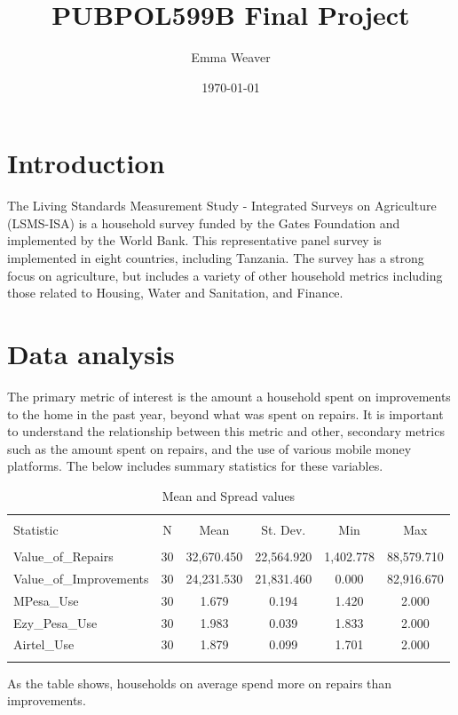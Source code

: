 \documentclass[11pt]{article}
\title{PUBPOL599B Final Project}
\author{
        Emma Weaver\\
}
\date{\today}
\begin{document}


\maketitle

\section{Introduction}\label{intro}
The Living Standards Measurement Study - Integrated Surveys on Agriculture (LSMS-ISA) is a household survey funded by the Gates Foundation and implemented by the World Bank. This representative panel survey is implemented in eight countries, including Tanzania. The survey has a strong focus on agriculture, but includes a variety of other household metrics including those related to Housing, Water and Sanitation, and Finance.

\section{Data analysis}\label{datas}

  The primary metric of interest is the amount a household spent on improvements to the home in the past year, beyond what was spent on repairs. It is important to understand the relationship between this metric and other, secondary metrics such as the amount spent on repairs, and the use of various mobile money platforms. The below includes summary statistics for these variables. 

\begin{table}[!htbp] \centering 
  \caption{Mean and Spread values} 
  \label{measures} 
\begin{tabular}{@{\extracolsep{5pt}}lccccc} 
\\[-1.8ex]\hline 
\hline \\[-1.8ex] 
Statistic & \multicolumn{1}{c}{N} & \multicolumn{1}{c}{Mean} & \multicolumn{1}{c}{St. Dev.} & \multicolumn{1}{c}{Min} & \multicolumn{1}{c}{Max} \\ 
\hline \\[-1.8ex] 
Value\_of\_Repairs & 30 & 32,670.450 & 22,564.920 & 1,402.778 & 88,579.710 \\ 
Value\_of\_Improvements & 30 & 24,231.530 & 21,831.460 & 0.000 & 82,916.670 \\ 
MPesa\_Use & 30 & 1.679 & 0.194 & 1.420 & 2.000 \\ 
Ezy\_Pesa\_Use & 30 & 1.983 & 0.039 & 1.833 & 2.000 \\ 
Airtel\_Use & 30 & 1.879 & 0.099 & 1.701 & 2.000 \\ 
\hline \\[-1.8ex] 
\end{tabular} 
\end{table}   As the table shows, households on average spend more on repairs than improvements. 
  
\end{document}
